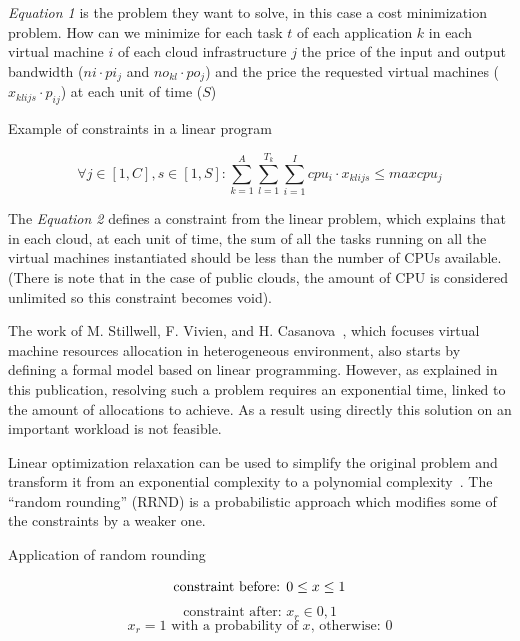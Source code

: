\textit{Equation 1} is the problem they want to solve, in this case a cost
minimization problem. How can we minimize for each task $t$ of each application
$k$ in each virtual machine $i$ of each cloud infrastructure $j$ the price of
the input and output bandwidth ($ni \cdot pi_j$ and $no_{kl} \cdot po_j$) and
the price the requested virtual machines ($x_{klijs} \cdot p_{ij}$) at each
unit of time ($S$)

\begin{figequation}
	\caption{Example of constraints in a linear program}
	\[
		\forall j \in [1,C], s \in [1,S]:
		\sum_{k=1}^{A} \sum_{l=1}^{T_k} \sum_{i=1}^{I} cpu_i \cdot x_{klijs} \leq maxcpu_j
	\]
\end{figequation}

The \textit{Equation 2} defines a constraint from the linear problem, which
explains that in each cloud, at each unit of time, the sum of all the tasks running
on all the virtual machines instantiated should be less than the number of CPUs
available. (There is note that in the case of public clouds, the amount of CPU
is considered unlimited so this constraint becomes void).

\vspace{1em}

The work of M. Stillwell, F. Vivien, and H.
Casanova~\cite{allocationHeterogeneous}, which focuses virtual machine
resources allocation in heterogeneous environment, also starts by defining a
formal model based on linear programming. However, as explained in this
publication, resolving such a problem requires an exponential time, linked to
the amount of allocations to achieve. As a result using directly this solution
on an important workload is not feasible.

\vspace{1em}

Linear optimization relaxation can be used to simplify the original problem and
transform it from an exponential complexity to a polynomial
complexity~\citet*{mathsRrndlp}. The “random rounding” (RRND) is a
probabilistic approach which modifies some of the constraints by a weaker one.

\begin{figequation}
	\caption{Application of random rounding}
	\[
		\text{constraint before: } 0 \leq x \leq 1 \\
	\]
	\[
		\text{constraint after: } x_r \in {0, 1}
	\]
	\[
		x_r = 1 \text{ with a probability of $x$, otherwise: $0$}
	\]
\end{figequation}

